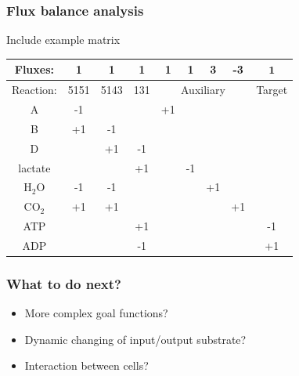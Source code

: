 \documentclass[11pt]{beamer}
\begin{document}
	\begin{frame}
		\frametitle{Flux balance analysis}
		
		Include example matrix
		
		\begin{tabular}{|c|c|c|c|c|c|c|c|c||}
			\hline Fluxes: & 1 & 1 & 1 & 1 & 1 & 3 & -3 & \color{red} $\mathbf{1}$ \\
			\hline	Reaction: & 5151& 5143 & 131 & \multicolumn{4}{c|}{Auxiliary }& Target \\
			\hline A & -1 &  &  & +1 &  &  & &  \\ 
			\hline B & +1 & -1 &  &  &  &  & &  \\ 
			\hline D &  & +1 & -1 &  &  &  & &  \\ 
			\hline lactate &  &  & +1 &  & -1 &  & &  \\ 
			\hline H$_2$O & -1 & -1 &  &  &  &+1  & &  \\ 
			\hline CO$_2$ & +1 & +1 &  &  &  &  & +1&  \\ 
			\hline ATP &  &  & +1 &  &  &  & & -1 \\ 
			\hline ADP &  &  & -1 &  &  &  & & +1 \\ 
			\hline  
		\end{tabular} 
	\end{frame}
	
	\begin{frame}
		\frametitle{What to do next?}
		
		\begin{itemize}
			\item More complex goal functions?
			\item Dynamic changing of input/output substrate?
			\item Interaction between cells? 
		\end{itemize}
	\end{frame}
	
\end{document}
